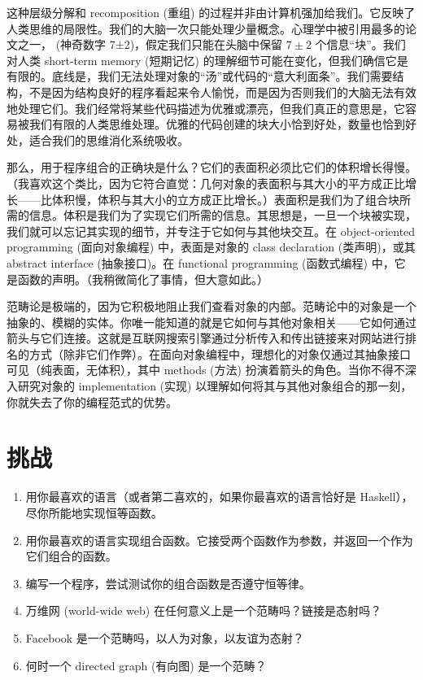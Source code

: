 这种层级分解和 recomposition (重组) 的过程并非由计算机强加给我们。它反映了人类思维的局限性。我们的大脑一次只能处理少量概念。心理学中被引用最多的论文之一，
 (神奇数字 7±2)，假定我们只能在头脑中保留 $7 \pm 2$ 个信息“块”。我们对人类 short-term memory (短期记忆) 的理解细节可能在变化，但我们确信它是有限的。底线是，我们无法处理对象的“汤”或代码的“意大利面条”。我们需要结构，不是因为结构良好的程序看起来令人愉悦，而是因为否则我们的大脑无法有效地处理它们。我们经常将某些代码描述为优雅或漂亮，但我们真正的意思是，它容易被我们有限的人类思维处理。优雅的代码创建的块大小恰到好处，数量也恰到好处，适合我们的思维消化系统吸收。

那么，用于程序组合的正确块是什么？它们的表面积必须比它们的体积增长得慢。（我喜欢这个类比，因为它符合直觉：几何对象的表面积与其大小的平方成正比增长——比体积慢，体积与其大小的立方成正比增长。）表面积是我们为了组合块所需的信息。体积是我们为了实现它们所需的信息。其思想是，一旦一个块被实现，我们就可以忘记其实现的细节，并专注于它如何与其他块交互。在 object-oriented programming (面向对象编程) 中，表面是对象的 class declaration (类声明)，或其 abstract interface (抽象接口)。在 functional programming (函数式编程) 中，它是函数的声明。（我稍微简化了事情，但大意如此。）

范畴论是极端的，因为它积极地阻止我们查看对象的内部。范畴论中的对象是一个抽象的、模糊的实体。你唯一能知道的就是它如何与其他对象相关——它如何通过箭头与它们连接。这就是互联网搜索引擎通过分析传入和传出链接来对网站进行排名的方式（除非它们作弊）。在面向对象编程中，理想化的对象仅通过其抽象接口可见（纯表面，无体积），其中 methods (方法) 扮演着箭头的角色。当你不得不深入研究对象的 implementation (实现) 以理解如何将其与其他对象组合的那一刻，你就失去了你的编程范式的优势。

\section{挑战}

\begin{enumerate}
  \tightlist
  \item
        用你最喜欢的语言（或者第二喜欢的，如果你最喜欢的语言恰好是 Haskell），尽你所能地实现恒等函数。
  \item
        用你最喜欢的语言实现组合函数。它接受两个函数作为参数，并返回一个作为它们组合的函数。
  \item
        编写一个程序，尝试测试你的组合函数是否遵守恒等律。
  \item
        万维网 (world-wide web) 在任何意义上是一个范畴吗？链接是态射吗？
  \item
        Facebook 是一个范畴吗，以人为对象，以友谊为态射？
  \item
        何时一个 directed graph (有向图) 是一个范畴？
\end{enumerate}
